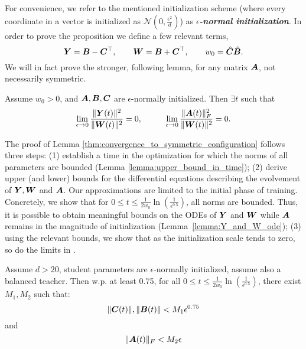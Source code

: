 For convenience, we refer to the mentioned initialization scheme (where every coordinate in a vector is initialized as $\mathcal{N}\left(0,\frac{\epsilon^2}{d}\right)$) as \textit{\textbf{$\epsilon$-normal initialization}}.
In order to prove the proposition we define a few relevant terms, 
\begin{equation}
    {\bm{Y}} = {\bm{B}} - {\bm{C}}^\top,\qquad {\bm{W}} = {\bm{B}} + {\bm{C}}^\top,\qquad w_0=\hat{{\bm{C}}}\hat{{\bm{B}}}.
\end{equation}
 We will in fact prove the stronger, following lemma, for any matrix ${\bm{A}}$, not necessarily symmetric.

\begin{lemma}\label{thm:convergence_to_symmetric_configuration}
Assume $w_0>0$, and ${\bm{A}},{\bm{B}},{\bm{C}}$ are $\epsilon$-normally initialized. Then $\exists t$ such that 
\begin{equation}\label{eq:balanced_prop_objective}
 \lim_{\epsilon\rightarrow 0}\frac{\|{\bm{Y}}(t)\|^2}{\|{\bm{W}}(t)\|^2}=0   ,\hspace{1cm} \lim_{\epsilon\rightarrow 0}\frac{\|{\bm{A}}(t)\|_F^2}{\|{\bm{W}}(t)\|^2}=0.
\end{equation}
\end{lemma}


The proof of Lemma \ref{thm:convergence_to_symmetric_configuration} follows three steps: (1) establish a time in the optimization for which the norms of all parameters are bounded (Lemma \ref{lemma:upper_bound_in_time}); (2) derive upper (and lower) bounds for the differential equations describing the evolvement of ${\bm{Y}},{\bm{W}}$ and ${\bm{A}}$. Our approximations are limited to the initial phase of training. Concretely, we show that for $0\le t\le \frac{1}{2w_0}\ln{\left(\frac{1}{\epsilon^{0.5}} \right)}$, all norms are bounded. Thus, it is possible to obtain meaningful bounds on the ODEs of ${\bm{Y}}$ and ${\bm{W}}$ while ${\bm{A}}$ remains in the magnitude of initialization (Lemma~\ref{lemma:Y_and_W_ode}); (3) using the relevant bounds, we show that as the initialization scale tends to zero, so do the limits in .


\begin{lemma}\label{lemma:upper_bound_in_time}
Assume $d>20$, student parameters are $\epsilon$-normally initialized, assume also a balanced teacher. Then w.p. at least 0.75, for all $0\leq t \leq \frac{1}{2w_0}\ln{\left( \frac{1}{\epsilon^{0.5}}\right)}$, there exist $M_1, M_2$ such that:
\begin{equation}
    \|{\bm{C}}(t)\|, \|{\bm{B}}(t)\| < M_1\epsilon^{0.75}
\end{equation}
and
\begin{equation}
    \|{\bm{A}}(t)\|_F < M_2 \epsilon
\end{equation}
\end{lemma}

